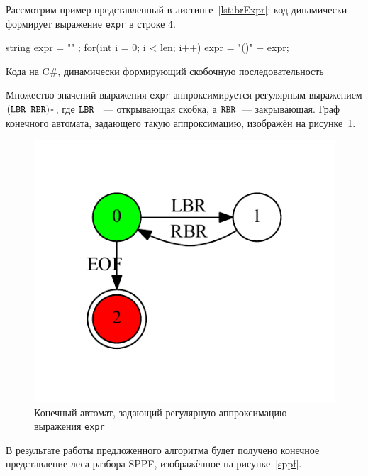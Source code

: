 Рассмотрим пример представленный в листинге~\ref{lst:brExpr}: код динамически формирует выражение \texttt{expr} в строке 4.

\begin{listing}
\begin{pyglist}[language=csharp,numbers=left,numbersep=5pt]
 string expr = "" ;
 for(int i = 0; i < len; i++) 
 {
     expr = "()" + expr;
 }
\end{pyglist}
\caption{Кода на C\#, динамически формирующий скобочную последовательность}
\label{lst:brExpr}
\end{listing}

Множество значений выражения \texttt{expr} аппроксимируется регулярным выражением $(\mbox{\texttt{LBR }} \mbox{\texttt{RBR}})*$, где $\mbox{\texttt{LBR }}$ --- открывающая скобка, а $\mbox{\texttt{RBR}}$~--- закрывающая. Граф конечного автомата, задающего такую аппроксимацию, изображён на рисунке~\ref{input}.

\begin{figure}[!h]
 \centering
 \includegraphics[]{pics/input.pdf}
 \caption{Конечный автомат, задающий регулярную аппроксимацию выражения \texttt{expr}}
 \label{input}
\end{figure}

В результате работы предложенного алгоритма будет получено конечное представление леса разбора SPPF, изображённое на рисунке~\ref{sppf}.

